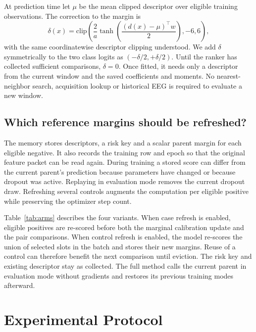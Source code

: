 \documentclass{article}
\begin{document}
At prediction time let $\mu$ be the mean clipped descriptor over eligible training observations. The correction to the margin is
\begin{equation}
 \delta(x)=\mathrm{clip}\!\left(
   \frac{2}{a}\tanh\!\left(\frac{(d(x)-\mu)^\top w}{2}\right),-6,6\right),
\end{equation}
with the same coordinatewise descriptor clipping understood. We add $\delta$ symmetrically to the two class logits as $(-\delta/2,+\delta/2)$. Until the ranker has collected sufficient comparisons, $\delta=0$. Once fitted, it needs only a descriptor from the current window and the saved coefficients and moments. No nearest-neighbor search, acquisition lookup or historical EEG is required to evaluate a new window.

\subsection{Which reference margins should be refreshed?}
The memory stores descriptors, a risk key and a scalar parent margin for each eligible negative. It also records the training row and epoch so that the original feature packet can be read again. During training a stored score can differ from the current parent's prediction because parameters have changed or because dropout was active. Replaying in evaluation mode removes the current dropout draw. Refreshing several controls augments the computation per eligible positive while preserving the optimizer step count.

Table~\ref{tab:arms} describes the four variants. When case refresh is enabled, eligible positives are re-scored before both the marginal calibration update and the pair comparisons. When control refresh is enabled, the model re-scores the union of selected slots in the batch and stores their new margins. Reuse of a control can therefore benefit the next comparison until eviction. The risk key and existing descriptor stay as collected. The full method calls the current parent in evaluation mode without gradients and restores its previous training modes afterward.






\section{Experimental Protocol}
\end{document}
